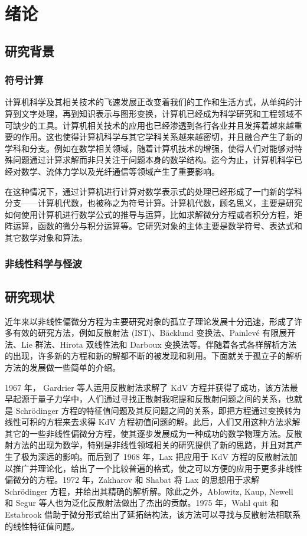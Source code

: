 \chapter{绪论}
\section{研究背景}
\subsection{符号计算}
计算机科学及其相关技术的飞速发展正改变着我们的工作和生活方式，从单纯的计算到文字处理，再到知识表示与图形变换，计算机已经成为科学研究和工程领域不可缺少的工具。计算机相关技术的应用也已经渗透到各行各业并且发挥着越来越重要的作用。这也使得计算机科学与其它学科关系越来越密切，并且融合产生了新的学科和分支。例如在数学相关领域，随着计算机技术的增强，使得人们对能够对特殊问题通过计算求解而非只关注于问题本身的数学结构。迄今为止，计算机科学已经对数学、流体力学以及光纤通信等领域产生了重要影响。

在这种情况下，通过计算机进行计算对数学表示式的处理已经形成了一门新的学科分支——计算机代数，也被称之为符号计算。计算机代数，顾名思义，主要是研究如何使用计算机进行数学公式的推导与运算，比如求解微分方程或者积分方程，矩阵运算，函数的微分与积分运算等。它研究对象的主体主要是数学符号、表达式和其它数学对象和算法。



\subsection{非线性科学与怪波}


\section{研究现状}
近年来以非线性偏微分方程为主要研究对象的孤立子理论发展十分迅速，形成了许多有效的研究方法，例如反散射法 (IST)、B\"{a}cklund 变换法、Painlev\'{e} 有限展开法、Lie 群法、Hirota 双线性法和 Darboux 变换法等。伴随着各式各样解析方法的出现，许多新的方程和新的解都不断的被发现和利用。下面就关于孤立子的解析方法的发展做一些简单的介绍。

1967 年， Gardrier 等人运用反散射法求解了 KdV 方程并获得了成功，该方法最早起源于量子力学中，人们通过寻找正散射我呢提和反散射问题之间的关系，也就是 Schr\"{o}dinger 方程的特征值问题及其反问题之间的关系，即把方程通过变换转为线性可积的方程来去求得 KdV 方程初值问题的解。此后，人们又用这种方法求解其它的一些非线性偏微分方程，使其逐步发展成为一种成功的数学物理方法。反散射方法的出现为数学，特别是非线性领域相关的研究提供了新的思路，并且对其产生了极为深远的影响。而后到了 1968 年，Lax 把应用于 KdV 方程的反散射法加以推广并理论化，给出了一个比较普遍的格式，使之可以方便的应用于更多非线性偏微分的方程。1972 年，Zakharov 和 Shabat 将 Lax 的思想用于求解 Schr\"{o}dinger 方程，并给出其精确的解析解。除此之外，Ablowitz, Kaup, Newell 和 Segur 等人也为泛化反散射法做出了杰出的贡献。1975 年，Wahl quit 和 Estabrook 借助于微分形式给出了延拓结构法，该方法可以寻找与反散射法相联系的线性特征值问题。

